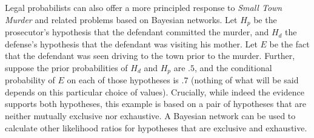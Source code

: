 \documentclass[
  10pt,
  dvipsnames,enabledeprecatedfontcommands]{scrartcl}
\begin{document}
Legal probabilists can also offer a more principled response to
\emph{Small Town Murder} and related problems based on Bayesian
networks. Let \(H_p\) be the prosecutor's hypothesis that the defendant
committed the murder, and \(H_d\) the defense's hypothesis that the
defendant was visiting his mother. Let \(E\) be the fact that the
defendant was seen driving to the town prior to the murder. Further,
suppose the prior probabilities of \(H_d\) and \(H_p\) are \(.5\), and
the conditional probability of \(E\) on each of those hypotheses is
\(.7\) (nothing of what will be said depends on this particular choice
of values). Crucially, while indeed the evidence supports both
hypotheses, this example is based on a pair of hypotheses that are
neither mutually exclusive nor exhaustive. A Bayesian network can be
used to calculate other likelihood ratios for hypotheses that are
exclusive and exhaustive.
\end{document}
